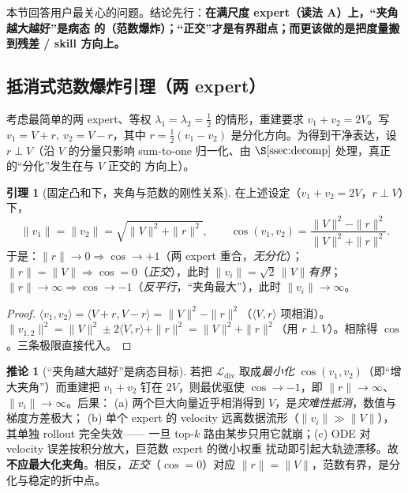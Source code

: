 \documentclass[11pt,a4paper]{article}
\newcommand{\loss}{\mathcal{L}}
\theoremstyle{definition}
\newtheorem{corollary}{推论}
\newtheorem{lemma}{引理}
\begin{document}
本节回答用户最关心的问题。结论先行：\textbf{在满尺度 expert（读法 A）上，``夹角越大越好''是病态
的（范数爆炸）；``正交''才是有界甜点；而更该做的是把度量搬到残差 / skill 方向上。}

\subsection{抵消式范数爆炸引理（两 expert）}
\label{ssec:blowup}

考虑最简单的两 expert、等权 $\lambda_1=\lambda_2=\tfrac12$ 的情形，重建要求 $v_1+v_2=2V$。写
$v_1=V+r,\ v_2=V-r$，其中 $r=\tfrac12(v_1-v_2)$ 是分化方向。为得到干净表达，设 $r\perp V$（沿 $V$
的分量只影响 sum-to-one 归一化、由 $\S\ref{ssec:decomp}$ 处理，真正的``分化''发生在与 $V$ 正交的
方向上）。

\begin{lemma}[固定凸和下，夹角与范数的刚性关系]
\label{lem:blowup}
在上述设定（$v_1+v_2=2V$，$r\perp V$）下，
\begin{equation}
\|v_1\|=\|v_2\|=\sqrt{\|V\|^2+\|r\|^2},\qquad
\cos(v_1,v_2)=\frac{\|V\|^2-\|r\|^2}{\|V\|^2+\|r\|^2}.
\label{eq:blowup}
\end{equation}
于是：$\|r\|\to0\Rightarrow\cos\to+1$（两 expert 重合，\emph{无分化}）；
$\|r\|=\|V\|\Rightarrow\cos=0$（\emph{正交}），此时 $\|v_i\|=\sqrt2\,\|V\|$\emph{有界}；
$\|r\|\to\infty\Rightarrow\cos\to-1$（\emph{反平行}，``夹角最大''），此时 $\|v_i\|\to\infty$。
\end{lemma}

\begin{proof}
$\langle v_1,v_2\rangle=\langle V+r,V-r\rangle=\|V\|^2-\|r\|^2$（$\langle V,r\rangle$ 项相消）。
$\|v_{1,2}\|^2=\|V\|^2\pm2\langle V,r\rangle+\|r\|^2=\|V\|^2+\|r\|^2$（用 $r\perp V$）。相除得
$\cos$。三条极限直接代入。
\end{proof}

\begin{corollary}[``夹角越大越好''是病态目标]
\label{cor:pathology}
若把 $\loss_{\mathrm{div}}$ 取成\emph{最小化} $\cos(v_1,v_2)$（即``增大夹角''）而重建把
$v_1+v_2$ 钉在 $2V$，则最优驱使 $\cos\to-1$，即 $\|r\|\to\infty$、$\|v_i\|\to\infty$。后果：
(a) 两个巨大向量近乎相消得到 $V$，是\emph{灾难性抵消}，数值与梯度方差极大；
(b) 单个 expert 的 velocity 远离数据流形（$\|v_i\|\gg\|V\|$），其单独 rollout 完全失效——
一旦 top-$k$ 路由某步只用它就崩；(c) ODE 对 velocity 误差按积分放大，巨范数 expert 的微小权重
扰动即引起大轨迹漂移。故\textbf{不应最大化夹角}。相反，\emph{正交}（$\cos=0$）对应
$\|r\|=\|V\|$，范数有界，是分化与稳定的折中点。
\end{corollary}
\end{document}
